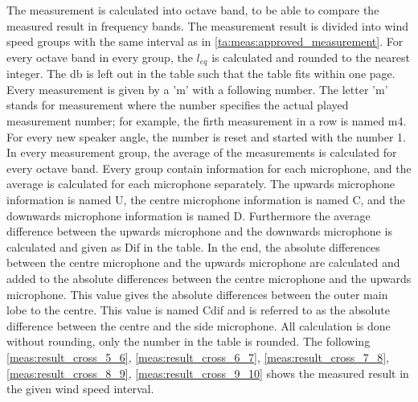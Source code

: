 The measurement is calculated into octave band, to be able to compare the measured result in frequency bands. The measurement result is divided into wind speed groups with the same interval as in \autoref{ta:meas:approved_measurement}. For every octave band in every group, the $l_{eq}$ is calculated and rounded to the nearest integer. The \si{\decibel} is left out in the table such that the table fits within one page. Every measurement is given by a 'm' with a following number. The letter 'm' stands for measurement where the number specifies the actual played measurement number; for example, the firth measurement in a row is named m4. For every new speaker angle, the number is reset and started with the number 1. In every measurement group, the average of the measurements is calculated for every octave band. Every group contain information for each microphone, and the average is calculated for each microphone separately. The upwards microphone information is named U, the centre microphone information is named C, and the downwards microphone information is named D. Furthermore the average difference between the upwards microphone and the downwards microphone is calculated and given as Dif in the table. In the end, the absolute differences between the centre microphone and the upwards microphone are calculated and added to the absolute differences between the centre microphone and the upwards microphone. This value gives the absolute differences between the outer main lobe to the centre. This value is named Cdif and is referred to as the absolute difference between the centre and the side microphone. All calculation is done without rounding, only the number in the table is rounded. The following \autoref{meas:result_cross_5_6}, \autoref{meas:result_cross_6_7}, \autoref{meas:result_cross_7_8}, \autoref{meas:result_cross_8_9}, \autoref{meas:result_cross_9_10} shows the measured result in the given wind speed interval.


